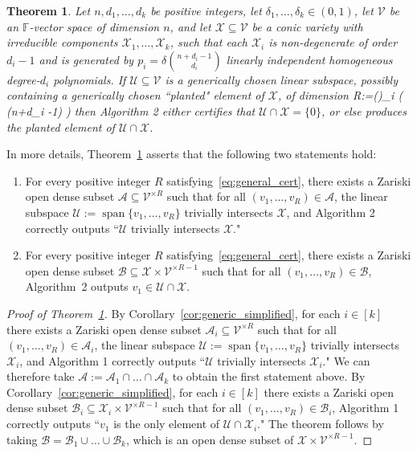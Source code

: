 \documentclass[11pt]{article}
\newtheorem{theorem}{Theorem}
\theoremstyle{definition}
\newcommand{\field}{\mathbb{F}}
\newcommand\X{\mathcal{X}}
\newcommand\A{\mathcal{A}}
\newcommand\B{\mathcal{B}}
\newcommand\V{\mathcal{V}}
\newcommand\U{\mathcal{U}}
\DeclareMathOperator{\spn}{span}
\newcommand{\anote}[1]{}
\def\ba#1\ea{\begin{align}#1\end{align}}
\begin{document}
\begin{theorem}\label{thm:general_cert}
Let $n, d_1,\dots, d_k$ be positive integers, let $\delta_1,\dots, \delta_k \in (0,1)$, let $\V$ be an $\field$-vector space of dimension $n$, and let $\X \subseteq \V$ be a conic variety with irreducible components $\X_1,\dots, \X_k$, such that each $\X_i$ is non-degenerate of order $d_i-1$ and is generated by $p_i= \delta \binom{n+d_i-1}{d_i}$ linearly independent homogeneous degree-$d_i$ polynomials. If $\U\subseteq \V$ is a generically chosen linear subspace, possibly containing a generically chosen ``planted" element of $\X$, of dimension
\ba\label{eq:general_cert}
R:=\dim(\U)\leq \min_{i \in [k]} \Big(  \cdot (n+d_i -1) \Big)  %
\ea
then Algorithm 2 either certifies that $\U \cap \X =\{0\}$, or else produces the planted element of $\U \cap \X$.
\end{theorem}
In more details, Theorem~\ref{thm:general_cert} asserts that the following two statements hold:
\begin{enumerate}
\item For every positive integer $R$ satisfying~\eqref{eq:general_cert}, there exists a Zariski open dense subset ${\A\subseteq \V^{\times R}}$ such that for all $(v_1,\dots, v_{R}) \in \A$, the linear subspace $\U:=\spn\{v_1,\dots, v_{R}\}$ trivially intersects $\X$, and Algorithm 2 correctly outputs ``$\U$ trivially intersects $\X$."
\item For every positive integer $R$ satisfying~\eqref{eq:general_cert}, there exists a Zariski open dense subset ${\B\subseteq \X \times \V^{\times {R-1}}}$ such that for all $(v_1,\dots, v_{R}) \in \B$, Algorithm~2 outputs $v_1\in \U \cap \X$.
\end{enumerate}

\begin{proof}[Proof of Theorem~\ref{thm:general_cert}]
By Corollary~\ref{cor:generic_simplified}, for each $i \in [k]$ there exists a Zariski open dense subset $\A_i \subseteq \V^{\times R}$ such that for all $(v_1,\dots, v_{R}) \in \A_i$, the linear subspace $\U:=\spn\{v_1,\dots, v_{R}\}$ trivially intersects $\X_i$, and Algorithm 1 correctly outputs ``$\U$ trivially intersects $\X_i$." We can therefore take $\A:=\A_1 \cap \dots \cap \A_k$ to obtain the first statement above. By Corollary~\ref{cor:generic_simplified}, for each $i \in [k]$ there exists a Zariski open dense subset $\B_i \subseteq \X_i \times \V^{\times {R-1}}$ such that for all $(v_1,\dots, v_{R}) \in \B_i$, Algorithm 1 correctly outputs ``$v_1$ is the only element of $\U \cap \X_i$." The theorem follows by taking $\B=\B_1 \cup \dots \cup \B_k$, which is an open dense subset of $\X \times \V^{\times R-1}$.
\end{proof}
\end{document}
